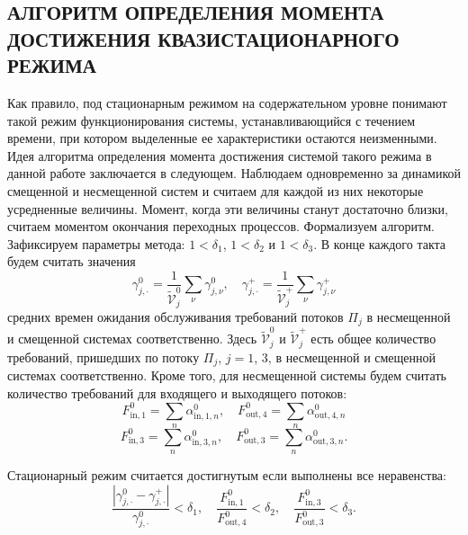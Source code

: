 \documentclass[11pt]{ubs}
\begin{document}
\subsection{АЛГОРИТМ ОПРЕДЕЛЕНИЯ МОМЕНТА ДОСТИЖЕНИЯ КВАЗИСТАЦИОНАРНОГО РЕЖИМА}
Как правило, под стационарным режимом на содержательном уровне понимают такой режим функционирования системы, устанавливающийся с течением времени, при котором выделенные ее характеристики остаются неизменными. Идея алгоритма определения момента достижения системой такого режима в данной работе заключается в следующем. Наблюдаем одновременно за динамикой смещенной и несмещенной систем и считаем для каждой из них некоторые усредненные величины. Момент, когда эти величины станут достаточно близки, считаем моментом окончания переходных процессов. Формализуем алгоритм. Зафиксируем параметры метода:  $1 < \delta_1$, $1 < \delta_2$ и $1 < \delta_3$. В конце каждого такта будем считать значения 
\begin{equation}
   \gamma_{j,\cdot}^0 = \frac{1}{\tilde{\mathcal{V}}_j^0}\sum_{\nu} \gamma_{j,\nu}^0, \quad \gamma_{j,\cdot}^+ = \frac{1}{\tilde{\mathcal{V}}_j^+}\sum_{\nu} \gamma_{j,\nu}^+ 
\end{equation}
средних времен ожидания обслуживания требований потоков $\Pi_j$ в несмещенной и смещенной системах соответственно. Здесь  $\tilde{\mathcal{V}}_j^0$ и  $\tilde{\mathcal{V}}_j^+$ есть общее количество требований, пришедших по потоку $\Pi_j$, $j=1$, $3$, в несмещенной и смещенной системах соответственно. Кроме того, для несмещенной системы будем считать количество требований для  входящего и выходящего потоков:
\begin{equation}
    F^{0}_{\text{in},1} = \sum_n \alpha^{0}_{\text{in},1,n}, \quad 
    F^{0}_{\text{out},4} = \sum_n \alpha^{0}_{\text{out},4,n}
\end{equation}
\begin{equation}
    F^{0}_{\text{in},3} = \sum_n \alpha^{0}_{\text{in},3,n}, \quad 
    F^{0}_{\text{out},3} = \sum_n \alpha^{0}_{\text{out},3,n}.
\end{equation}


Стационарный режим считается достигнутым если выполнены все неравенства:
\begin{equation}
    \frac{|\gamma_{j,\cdot}^0 - \gamma_{j,\cdot}^+|}{\gamma_{j,\cdot}^0} < \delta_1, \quad
    \frac{F^{0}_{\text{in},1}}{F^{0}_{\text{out},4}} < \delta_2, \quad 
    \frac{F^{0}_{\text{in},3}}{F^{0}_{\text{out},3}} < \delta_3.
    \label{neqs}
\end{equation}
\end{document}
